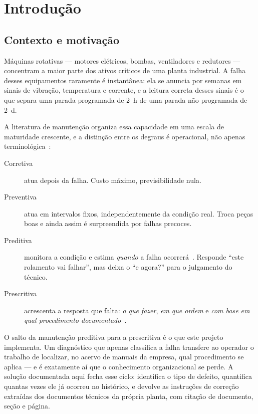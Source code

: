 \chapter{Introdução}
\label{cap:introducao}

\section{Contexto e motivação}

Máquinas rotativas --- motores elétricos, bombas, ventiladores e redutores ---
concentram a maior parte dos ativos críticos de uma planta industrial. A falha
desses equipamentos raramente é instantânea: ela se anuncia por semanas em
sinais de vibração, temperatura e corrente, e a leitura correta desses sinais é
o que separa uma parada programada de \SI{2}{\hour} de uma parada não programada
de \SI{2}{\day}.

A literatura de manutenção organiza essa capacidade em uma escala de maturidade
crescente, e a distinção entre os degraus é operacional, não apenas
terminológica~\cite{abnt5462, jardine2006review, zonta2020predictive}:

\begin{description}
  \item[Corretiva] atua depois da falha. Custo máximo, previsibilidade nula.
  \item[Preventiva] atua em intervalos fixos, independentemente da condição
    real. Troca peças boas e ainda assim é surpreendida por falhas precoces.
  \item[Preditiva] monitora a condição e estima \emph{quando} a falha
    ocorrerá~\cite{iso17359, iso13381}. Responde \enquote{este rolamento vai
    falhar}, mas deixa o \enquote{e agora?} para o julgamento do técnico.
  \item[Prescritiva] acrescenta a resposta que falta: \emph{o que fazer},
    \emph{em que ordem} e \emph{com base em qual procedimento
    documentado}~\cite{ansari2019prima}.
\end{description}

O salto da manutenção preditiva para a prescritiva é o que este projeto
implementa. Um diagnóstico que apenas classifica a falha transfere ao operador
o trabalho de localizar, no acervo de manuais da empresa, qual procedimento se
aplica --- e é exatamente aí que o conhecimento organizacional se perde. A
solução documentada aqui fecha esse ciclo: identifica o tipo de defeito,
quantifica quantas vezes ele já ocorreu no histórico, e devolve as instruções de
correção extraídas dos documentos técnicos da própria planta, com citação de
documento, seção e página.


